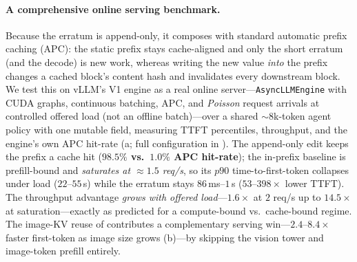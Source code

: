 \paragraph{A comprehensive online serving benchmark.} Because the erratum is append-only, it composes
with standard automatic prefix caching (APC): the static prefix stays cache-aligned and only the short
erratum (and the decode) is new work, whereas writing the new value \emph{into} the prefix changes a cached
block's content hash and invalidates every downstream block. We test this on vLLM's V1 engine as a real
online server---\texttt{AsyncLLMEngine} with CUDA graphs, continuous batching, APC, and \emph{Poisson}
request arrivals at controlled offered load (not an offline batch)---over a shared ${\sim}8$k-token agent
policy with one mutable field, measuring TTFT percentiles, throughput, and the engine's own APC hit-rate
(a; full configuration in ). The append-only edit keeps the prefix a cache hit (\textbf{$98.5\%$ vs.\ $1.0\%$ APC
hit-rate}); the in-prefix baseline is prefill-bound and \emph{saturates at ${\approx}1.5$ req/s}, so its
$p90$ time-to-first-token collapses under load ($22$--$55$\,s) while the erratum stays $86$\,ms--$1$\,s
($53$--$398\times$ lower TTFT). The throughput advantage \emph{grows with offered load}---$1.6\times$ at
$2$ req/s up to $\mathbf{14.5\times}$ at saturation---exactly as predicted for a compute-bound vs.\
cache-bound regime. The image-KV reuse of  contributes a complementary serving
win---$2.4$--$8.4\times$ faster first-token as image size grows (\Cref{fig:sys}b)---by skipping the vision
tower and image-token prefill entirely.
